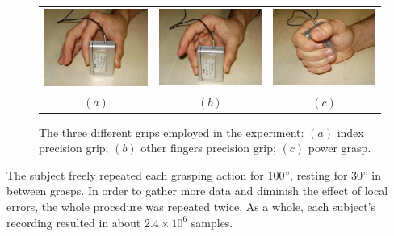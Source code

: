 \begin{figure}[!t] \centering
  \begin{tabular}{ccc}
   \includegraphics[height=0.16\textheight]{figs/grip1} &
    \includegraphics[height=0.16\textheight]{figs/grip2} &
    \includegraphics[height=0.16\textheight]{figs/grip3} \\
    $(a)$ & $(b)$ & $(c)$ \\
  \end{tabular}
  \caption{The three different grips employed in the experiment: $(a)$
   index precision grip; $(b)$ other fingers precision grip; $(c)$
   power grasp.}
  \label{fig:Grasps}
\end{figure}

The subject freely repeated each grasping action
for $100$'', resting for $30$'' in between grasps. In order to gather
more data and diminish the effect of local errors, the whole procedure
was repeated twice. As a whole, each subject's recording resulted in
about $2.4\times 10^6$ samples. 

